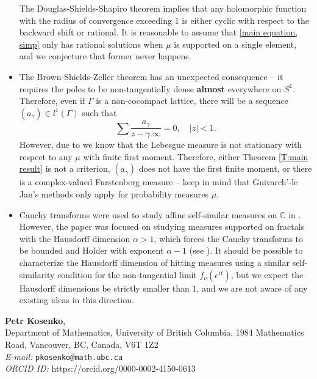 \documentclass[11pt]{article}
\makeatletter
\newcommand{\Addresses}{{%
		\bigskip
		\footnotesize
		\noindent
		\textbf{Petr Kosenko}, \\
		Department of Mathematics, University of British Columbia, 1984 Mathematics Road, Vancouver, BC, Canada, V6T 1Z2 \\	
		\textit{E-mail:} \texttt{pkosenko@math.ubc.ca} \\
		\textit{ORCID ID:} https://orcid.org/0000-0002-4150-0613
}}
\makeatother
\begin{document}
\begin{itemize}
	The Douglas-Shields-Shapiro theorem implies that any holomorphic function with the radius of convergence exceeding $1$ is either cyclic with respect to the backward shift or rational. It is reasonable to assume that \eqref{main equation, simp} only has rational solutions when $\mu$ is supported on a single element, and we conjecture that former never happens.
	\item The Brown-Shields-Zeller theorem has an unexpected consequence -- it requires the poles to be non-tangentially dense \textbf{almost} everywhere on $S^1$. Therefore, even if $\Gamma$ is a non-cocompact lattice, there will be a sequence $(a_\gamma) \in l^1(\Gamma)$ such that
	\[
	\sum \frac{a_\gamma}{z - \gamma.\infty} = 0, \quad |z| < 1.
	\]
	However, due to \cite{guivarch1990} we know that the Lebesgue measure is not stationary with respect to any $\mu$ with finite first moment. Therefore, either Theorem \ref{T:main result} is not a criterion, $(a_\gamma)$ does not have the first finite moment, or there is a complex-valued Furstenberg measure -- keep in mind that Guivarch'-le Jan's methods only apply for probability measures $\mu$.
	\item Cauchy transforms were used to study affine self-similar measures on $\mathbb{C}$ in \cite{lund1998cauchy}. However, the paper was focused on studying measures supported on fractals with the Hausdorff dimension $\alpha> 1$, which forces the Cauchy transforms to be bounded and Holder with exponent $\alpha - 1$ (see \cite[Theorem 2.1(b)]{lund1998cauchy}). It should be possible to characterize the Hausdorff dimension of hitting measures using a similar self-similarity condition for the non-tangential limit $f_\nu(e^{it})$, but we expect the Hausdorff dimensions be strictly smaller than $1$, and we are not aware of any existing ideas in this direction.
\end{itemize}

\printbibliography
\Addresses
\end{document}
